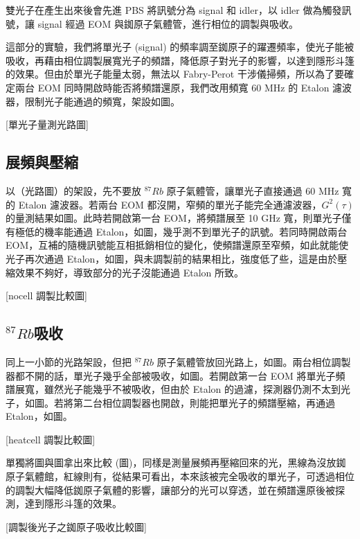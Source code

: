 \documentclass[class=NCU_thesis, crop=false]{standalone}
\begin{document}
雙光子在產生出來後會先進 PBS 將訊號分為 signal 和 idler，以 idler 做為觸發訊號，讓 signal 經過 EOM 與銣原子氣體管，進行相位的調製與吸收。

這部分的實驗，我們將單光子 (signal) 的頻率調至銣原子的躍遷頻率，使光子能被吸收，再藉由相位調製展寬光子的頻譜，降低原子對光子的影響，以達到隱形斗篷的效果。但由於單光子能量太弱，無法以 Fabry-Perot 干涉儀掃頻，所以為了要確定兩台 EOM 同時開啟時能否將頻譜還原，我們改用頻寬 60 MHz 的 Etalon 濾波器，限制光子能通過的頻寬，架設如圖。

[單光子量測光路圖]

\subsection{展頻與壓縮}
以（光路圖）的架設，先不要放 $^{87}Rb$ 原子氣體管，讓單光子直接通過 60 MHz 寬的 Etalon 濾波器。若兩台 EOM 都沒開，窄頻的單光子能完全通濾波器，$G^{2}(\tau)$ 的量測結果如圖。此時若開啟第一台 EOM，將頻譜展至 10 GHz 寬，則單光子僅有極低的機率能通過 Etalon，如圖，幾乎測不到單光子的訊號。若同時開啟兩台 EOM，互補的隨機訊號能互相抵銷相位的變化，使頻譜還原至窄頻，如此就能使光子再次通過 Etalon，如圖，與未調製前的結果相比，強度低了些，這是由於壓縮效果不夠好，導致部分的光子沒能通過 Etalon 所致。

[nocell 調製比較圖]

\subsection{$^{87}Rb$吸收}
同上一小節的光路架設，但把 $^{87}Rb$ 原子氣體管放回光路上，如圖。兩台相位調製器都不開的話，單光子幾乎全部被吸收，如圖。若開啟第一台 EOM 將單光子頻譜展寬，雖然光子能幾乎不被吸收，但由於 Etalon 的過濾，探測器仍測不太到光子，如圖。若將第二台相位調製器也開啟，則能把單光子的頻譜壓縮，再通過 Etalon，如圖。

[heatcell 調製比較圖]

單獨將圖與圖拿出來比較 (圖)，同樣是測量展頻再壓縮回來的光，黑線為沒放銣原子氣體館，紅線則有，從結果可看出，本來該被完全吸收的單光子，可透過相位的調製大幅降低銣原子氣體的影響，讓部分的光可以穿透，並在頻譜還原後被探測，達到隱形斗篷的效果。

[調製後光子之銣原子吸收比較圖]
\end{document}
